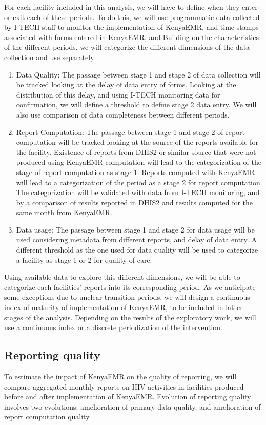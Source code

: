 \documentclass[a4paper,11pt,final,twoside]{article}
\begin{document}
For each facility included in this analysis, we will have to define when they enter or exit each of these periods. To do this, we will use programmatic data collected by I-TECH staff to monitor the implementation of KenyaEMR, and time stamps associated with forms entered in KenyaEMR, and Building on the characteristics of the different periods, we will categorize the different dimensions of the data collection and use separately:
\begin{enumerate}
\item    Data Quality: The passage between stage 1 and stage 2 of data collection will be tracked looking at the delay of data entry of forms. Looking at the distribution of this delay, and using I-TECH monitoring data for confirmation, we will define a threshold to define stage 2 data entry. We will also use comparison of data completeness between different periods.
\item	Report Computation: The passage between stage 1 and stage 2 of report computation will be tracked looking at the source of the reports available for the facility. Existence of reports from DHIS2 or similar source that were not produced using KenyaEMR computation will lead to the categorization of the stage of report computation as stage 1. Reports computed with KenyaEMR will lead to a categorization of the period as a stage 2 for report computation. The categorization will be validated with data from I-TECH monitoring, and by a comparison of results reported in DHIS2 and results computed for the same month from KenyaEMR.
\item	Data usage: The passage between stage 1 and stage 2 for data usage will be used considering metadata from different reports, and delay of data entry. A different threshold as the one used for data quality will be used to categorize a facility as stage 1 or 2 for quality of care.
\end{enumerate}

Using available data to explore this different dimensions, we will be able to categorize each facilities’ reports into its corresponding period. As we anticipate some exceptions due to unclear transition periods, we will design a continuous index of maturity of implementation of KenyaEMR, to be included in latter stages of the analysis. Depending on the results of the exploratory work, we will use a continuous index or a discrete periodization of the intervention.

\subsection{Reporting quality}
To estimate the impact of KenyaEMR on the quality of reporting, we will compare aggregated monthly reports on HIV activities in facilities produced before and after implementation of KenyaEMR. Evolution of reporting quality involves two evolutions: amelioration of primary data quality, and amelioration of report computation quality.
\end{document}
